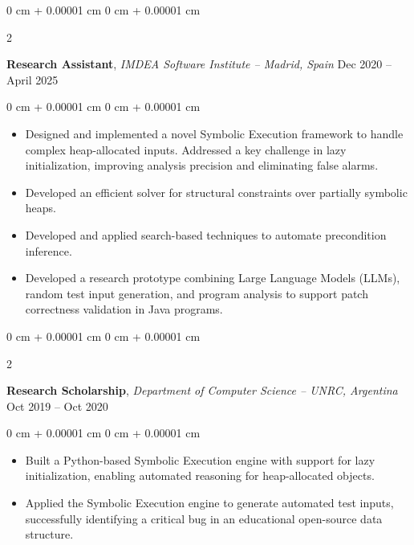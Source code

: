 \documentclass[10pt, letterpaper]{article}
\newenvironment{highlights}{
    \begin{itemize}[
        topsep=0.10 cm,
        parsep=0.10 cm,
        partopsep=0pt,
        itemsep=0pt,
        leftmargin=0 cm + 10pt
    ]
}{
    \end{itemize}
} %
\newenvironment{onecolentry}{
    \begin{adjustwidth}{
        0 cm + 0.00001 cm
    }{
        0 cm + 0.00001 cm
    }
}{
    \end{adjustwidth}
} %
\newenvironment{twocolentry}[2][]{
    \onecolentry
    \def\secondColumn{#2}
    \setcolumnwidth{\fill, 4.5 cm}
    \begin{paracol}{2}
}{
    \switchcolumn \raggedleft \secondColumn
    \end{paracol}
    \endonecolentry
} %
\begin{document}
        
        \vspace{0.2 cm}


        \begin{twocolentry}{
            Dec 2020 – April 2025
        }
            \textbf{Research Assistant}, \textit{IMDEA Software Institute -- Madrid, Spain} \end{twocolentry}

        \vspace{0.10 cm}
        \begin{onecolentry}
            \begin{highlights}
                \item Designed and implemented a novel Symbolic Execution
                framework to handle complex heap-allocated inputs. Addressed a
                key challenge in lazy initialization, improving analysis
                precision and eliminating false alarms.
                \item Developed an efficient solver for structural constraints over partially symbolic heaps.
                \item Developed and applied search-based techniques to automate precondition inference.
                \item Developed a research prototype combining Large Language Models (LLMs), random test input generation, and program analysis to support patch correctness validation in Java programs.
            \end{highlights}
        \end{onecolentry}



        \vspace{0.2 cm}



        \begin{twocolentry}{
            Oct 2019 – Oct 2020
        }
            \textbf{Research Scholarship}, \textit{Department of Computer Science -- UNRC, Argentina} \end{twocolentry}

        \vspace{0.10 cm}
        \begin{onecolentry}
            \begin{highlights}
                \item Built a Python-based Symbolic Execution engine with
                support for lazy initialization, enabling automated reasoning
                for heap-allocated objects.
                \item Applied the Symbolic Execution engine to generate
                automated test inputs, successfully identifying a critical bug
                in an educational open-source data structure.
            \end{highlights}
        \end{onecolentry}
\end{document}
